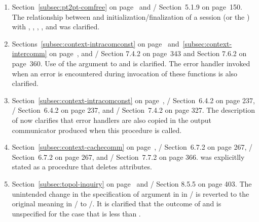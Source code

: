 \begin{enumerate}
\item
  Section~\ref{subsec:pt2pt-comfree} on page~\pageref{subsec:pt2pt-comfree}
  and \MPIIVDOTO/ Section~5.1.9 on page~150.
\newline
The relationship between  and initialization/finalization of a session (or the \wpm{})
with , , ,
, and 
was clarified.

\item
	Sections~\ref{subsec:context-intracomconst} on page~\pageref{subsec:context-intracomconst} and~\ref{subsec:context-intercomm} on page~\pageref{subsec:context-intercomm}, and \MPIIVDOTO/ Section 7.4.2 on page~343 and Section 7.6.2 on page~360.
  \newline
  Use of the  argument to  and  is clarified.
  The error handler invoked when an error is encountered during invocation of these functions is also clarified.

\item
  Section~\ref{subsec:context-intracomconst} on page~\pageref{subsec:context-intracomconst}, \MPIIII/ Section~6.4.2 on page 237,
  \MPIIIIDOTI/ Section~6.4.2 on page 237, and \MPIIV/ Section~7.4.2 on page 327. 
  \newline
  The description of  now clarifies that error handlers are also copied in
  the output communicator produced when this procedure is called.

\item
  Section~\ref{subsec:context-cachecomm} on page~\pageref{subsec:context-cachecomm}, \MPIIII/ Section~6.7.2 on page 267, \MPIIIIDOTI/ Section~6.7.2 on page 267, and \MPIIV/ Section~7.7.2 on page 366.
  \newline
   was explicitlly stated as a procedure that deletes attributes.
  
\item
  Section~\ref{subsec:topol-inquiry} on page~\pageref{subsec:topol-inquiry} and \MPIIVDOTO/ Section 8.5.5 on page 403. 
  \newline
  The unintended change in the specification of argument  in  in \MPIIVDOTO/ is reverted to the original meaning in \MPIIDOTI/ to \MPIIIIDOTI/. It is clarified that the outcome of                and  is unspecified for the case that  is less than .


\end{enumerate}
